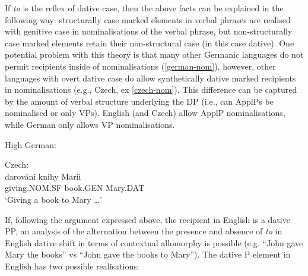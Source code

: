 	If \textit{to} is the reflex of dative case, then the above facts can be explained in the following way: structurally case marked elements in verbal phrases are realised with genitive case in nominalisations of the verbal phrase, but non-structurally case marked elements retain their non-structural case (in this case dative). One potential problem with this theory is that many other Germanic languages do not permit recipients inside of nominalisations (\ref{german-nom}), however, other languages with overt dative case do allow synthetically dative marked recipients in nominalisations (e.g., Czech, ex \ref{czech-nom}). This difference can be captured by the amount of verbal structure underlying the DP (i.e., can ApplPs be nominalised or only VPs). English (and Czech) allow ApplP nominalisations, while German only allows VP nominalisations.

	\begin{exe}
		\ex High German:\label{german-nom}
		\begin{xlist}

		\end{xlist}
		\ex Czech:\label{czech-nom}\\
		\gll darov\'{a}n\'{i} knihy Marii\\
		giving.NOM.SF book.GEN Mary.DAT\\
		\trans `Giving a book to Mary \ldots \citep[ex. 14]{Dvorak.2009}'
	\end{exe}

	If, following the argument expressed above, the recipient in English is a dative PP, an analysis of the alternation between the presence and absence of \textit{to} in English dative shift in terms of contextual allomorphy is possible (e.g. ``John gave Mary the books'' vs ``John gave the books to Mary''). The dative P element in English has two possible realisations:

